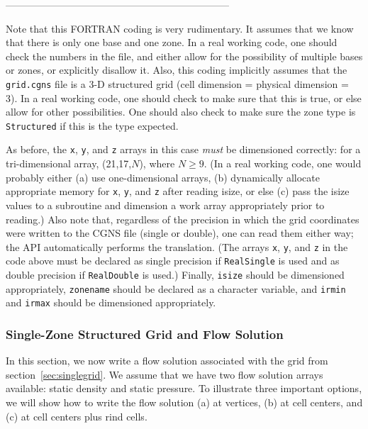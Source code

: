 \documentclass[12pt]{article}
\begin{document}
--------------------------------------------------------------------

\noindent Note that this
FORTRAN coding is very rudimentary.  It
assumes that we know that there is only one base and one zone.
In a real working code, one
should check the numbers in the file, and either
allow for the possibility of multiple bases or zones,
or explicitly disallow it.  Also, this coding implicitly 
assumes that the {\tt grid.cgns} file is a 3-D structured grid
(cell dimension = physical dimension = 3).  In a real working
code, one should check to make sure that this is true, or
else allow for other possibilities.  One
should also check to make sure the zone type is {\tt Structured}
if this is the type expected.

As before, the {\tt x}, {\tt y}, and {\tt z} arrays in this case {\it must}
be dimensioned correctly:  for a tri-dimensional array,
(21,17,$N$), where $N \geq 9$.
(In a real
working code, one would probably either (a) use one-dimensional
arrays, (b) dynamically allocate
appropriate memory for {\tt x}, {\tt y}, and {\tt z} after reading isize, 
or else (c) pass the isize
values to a subroutine and dimension a work array appropriately
prior to reading.)
Also note that, regardless of the precision in which the
grid coordinates were written
to the CGNS file (single or double), one can read them 
either way; the API automatically
performs the translation.  (The arrays {\tt x}, {\tt y}, and {\tt z} in the code above
must be declared
as single precision if {\tt RealSingle} is used and as
double precision if {\tt RealDouble} is used.)
Finally, {\tt isize} should be dimensioned appropriately,
{\tt zonename} should be declared as a character variable,
and {\tt irmin} and {\tt irmax} should be dimensioned appropriately.

\subsubsection{Single-Zone Structured Grid and Flow Solution} \label{sec:flowsoln}

In this section, we now write a flow solution associated with
the grid from section~\ref{sec:singlegrid}.  We assume that
we have two flow solution arrays available:  static density and 
static pressure.  To illustrate three important options, we will
show how to write the flow solution (a) at vertices, (b) at
cell centers, and (c) at cell centers plus rind cells.  

~

\noindent{}
\end{document}

